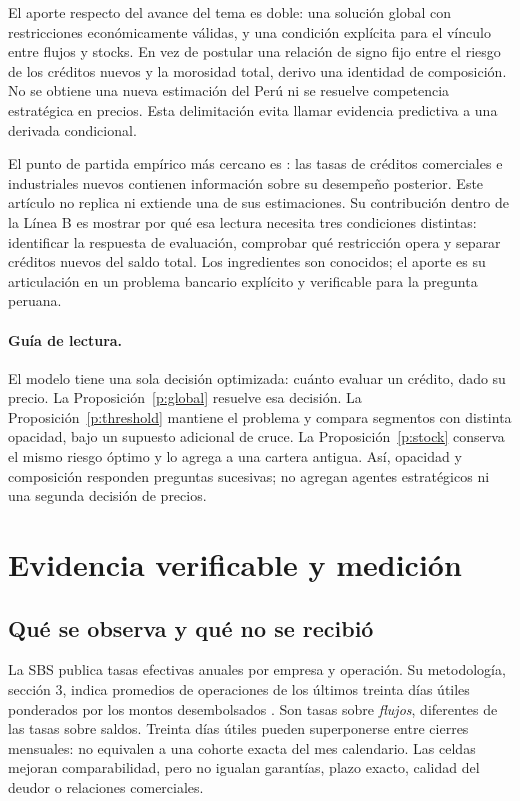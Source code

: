 \documentclass[11pt]{article}
\theoremstyle{definition}\newtheorem{assumption}{Supuesto}
\begin{document}
El aporte respecto del avance del tema es doble: una solución global con
restricciones económicamente válidas, y una condición explícita para el
vínculo entre flujos y stocks. En vez de postular una relación de signo fijo
entre el riesgo de los créditos nuevos y la morosidad total, derivo una
identidad de composición. No se obtiene una
nueva estimación del Perú ni se resuelve competencia estratégica en precios.
Esta delimitación evita llamar evidencia predictiva a una derivada condicional.

El punto de partida empírico más cercano es \citet{morgan2003}: las tasas de
créditos comerciales e industriales nuevos contienen información sobre su
desempeño posterior. Este artículo no replica ni extiende una de sus
estimaciones. Su contribución dentro de la Línea B es mostrar por qué esa
lectura necesita tres condiciones distintas: identificar la respuesta de
evaluación, comprobar qué restricción opera y separar créditos nuevos del
saldo total. Los ingredientes son conocidos; el aporte es su articulación
en un problema bancario explícito y verificable para la pregunta peruana.

\paragraph{Guía de lectura.}
El modelo tiene una sola decisión optimizada: cuánto evaluar un crédito,
dado su precio. La Proposición~\ref{p:global} resuelve esa decisión. La
Proposición~\ref{p:threshold} mantiene el problema y compara segmentos con
distinta opacidad, bajo un supuesto adicional de cruce. La
Proposición~\ref{p:stock} conserva el mismo riesgo óptimo y lo agrega a una
cartera antigua. Así, opacidad y composición responden preguntas sucesivas;
no agregan agentes estratégicos ni una segunda decisión de precios.

\section{Evidencia verificable y medición}
\subsection{Qué se observa y qué no se recibió}
La SBS publica tasas efectivas anuales por empresa y operación. Su metodología,
sección 3, indica promedios de operaciones de los últimos treinta días útiles
ponderados por los montos desembolsados \citep{sbsmetodo}. Son tasas sobre
\emph{flujos}, diferentes de las tasas sobre saldos. Treinta días útiles
pueden superponerse entre cierres mensuales: no equivalen a una cohorte exacta
del mes calendario. Las celdas mejoran comparabilidad, pero no igualan
garantías, plazo exacto, calidad del deudor o relaciones comerciales.
\end{document}
